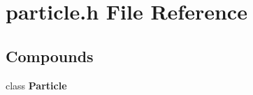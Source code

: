 \section{particle.h File Reference}
\label{particle.h}


\subsection*{Compounds}
\begin{CompactItemize}
\item 
class {\bf Particle}
\end{CompactItemize}
